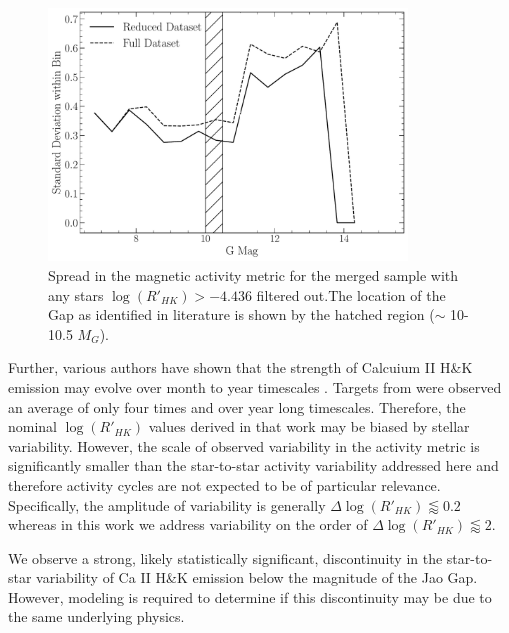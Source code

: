 \begin{figure}
  \centering
  \includegraphics[width=0.85\textwidth]{figures/jaoMagActivity/ReducedDeviation.pdf}
  \caption{Spread in the magnetic activity metric for the merged sample with
  any stars $\log(R'_{HK}) > -4.436$ filtered out.The location of the Gap
  as identified in literature is shown by the hatched region ($\sim$ 10-10.5 $M_{G}$).}
  \label{fig:reduced}
\end{figure}

Further, various authors have shown that the strength of Calcuium II
H\&K emission may evolve over month to year timescales
\citep[e.g.][]{Rauscher2006, Perdelwitz2021, Cretignier2024}. Targets from
\citet{Boudreaux2022} were observed an average of only four times and over year
long timescales. Therefore, the nominal $\log(R'_{HK})$ values derived in that
work may be biased by stellar variability. However, the scale of observed
variability in the activity metric is significantly smaller than the
star-to-star activity variability addressed here and therefore activity cycles
are not expected to be of particular relevance. Specifically, the amplitude of
variability is generally $\Delta \log(R'_{HK}) \lessapprox 0.2$ whereas in this
work we address variability on the order of $\Delta \log(R'_{HK}) \lessapprox 2$.

We observe a strong, likely statistically significant, discontinuity in the
star-to-star variability of Ca II H\&K emission below the magnitude
of the Jao Gap. However, modeling is required to determine if this discontinuity
may be due to the same underlying physics.


